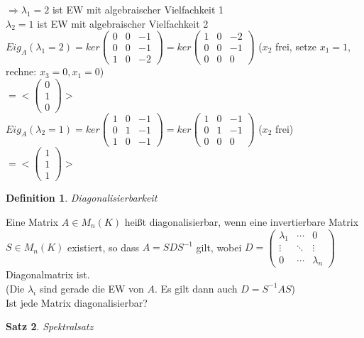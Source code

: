 \documentclass[a4paper,11pt]{article}
\newtheorem{definition}{Definition}[section]
\newtheorem{satz}[definition]{Satz}
\begin{document}
\begin{enumerate}[label=\alph*)]
$\Rightarrow \lambda_1=2$ ist EW mit algebraischer Vielfachkeit 1 \\
$\lambda_2=1$ ist EW mit algebraischer Vielfachkeit 2 \\
$Eig_A(\lambda_1=2)=ker\begin{pmatrix}0&0&-1\\0&0&-1\\1&0&-2\end{pmatrix}=ker\begin{pmatrix}1&0&-2\\0&0&-1\\0&0&0\end{pmatrix}$ ($x_2$ frei, setze $x_1=1$, rechne: $x_3=0, x_1=0$) \\
$=<\begin{pmatrix}0\\1\\0\end{pmatrix}>$ \\
$Eig_A(\lambda_2=1)=ker\begin{pmatrix}1&0&-1\\0&1&-1\\1&0&-1\end{pmatrix}=ker\begin{pmatrix}1&0&-1\\0&1&-1\\0&0&0\end{pmatrix}$ ($x_2$ frei) \\
$=<\begin{pmatrix}1\\1\\1\end{pmatrix}>$
\end{enumerate}
\begin{definition}
Diagonalisierbarkeit
\end{definition}
Eine Matrix $A\in M_n(K)$ heißt diagonalisierbar, wenn eine invertierbare Matrix $S\in M_n(K)$ existiert, so dass $A=SDS^{-1}$ gilt, wobei $D=\begin{pmatrix}\lambda_1&\cdots&0\\\vdots&\ddots&\vdots\\0&\cdots&\lambda_n\end{pmatrix}$ Diagonalmatrix ist. \\
(Die $\lambda_i$ sind gerade die EW von $A$. Es gilt dann auch $D=S^{-1}AS$) \\
Ist jede Matrix diagonalisierbar?
\newpage
\begin{satz}
Spektralsatz
\end{satz}
\end{document}

